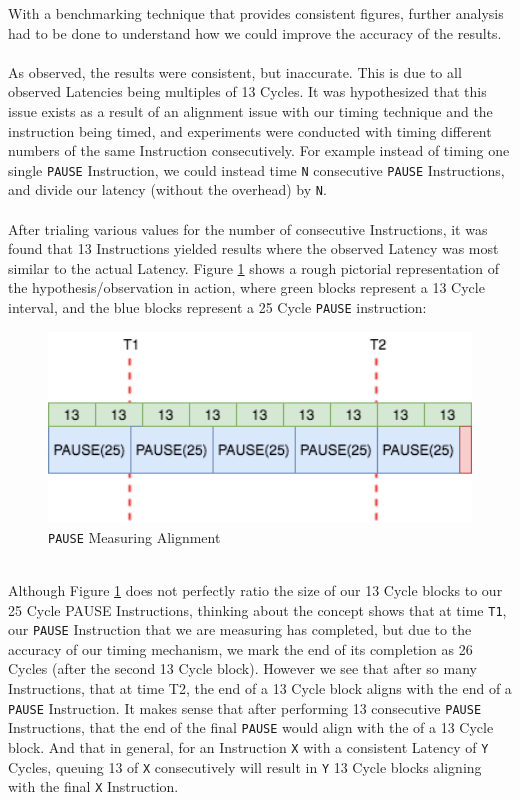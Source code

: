 \documentclass[bsc,frontabs,twoside,singlespacing,parskip,deptreport]{infthesis}     %
\begin{document}
With a benchmarking technique that provides consistent figures, further analysis had to be done to understand how we could improve the accuracy of the results. \\
\\
As observed, the results were consistent, but inaccurate. This is due to all observed Latencies being multiples of 13 Cycles. It was hypothesized that this issue exists as a result of an alignment issue with our timing technique and the instruction being timed, and experiments were conducted with timing different numbers of the same Instruction consecutively. For example instead of timing one single \texttt{PAUSE} Instruction, we could instead time \texttt{N} consecutive \texttt{PAUSE} Instructions, and divide our latency (without the overhead) by \texttt{N}. \\
\\
After trialing various values for the number of consecutive Instructions, it was found that 13 Instructions yielded results where the observed Latency was most similar to the actual Latency. Figure \ref{fig:measure-alignment} shows a rough pictorial representation of the hypothesis/observation in action, where green blocks represent a 13 Cycle interval, and the blue blocks represent a 25 Cycle \texttt{PAUSE} instruction:
\\
\begin{figure}[h]
    \includegraphics[width=12cm]{MeasureAlignment.png}
    \centering
    \caption{\texttt{PAUSE} Measuring Alignment}
    \label{fig:measure-alignment}
\end{figure}
\\
Although Figure \ref{fig:measure-alignment} does not perfectly ratio the size of our 13 Cycle blocks to our 25 Cycle PAUSE Instructions, thinking about the concept shows that at time \texttt{T1}, our \texttt{PAUSE} Instruction that we are measuring has completed, but due to the accuracy of our timing mechanism, we mark the end of its completion as 26 Cycles (after the second 13 Cycle block). However we see that after so many Instructions, that at time T2, the end of a 13 Cycle block aligns with the end of a \texttt{PAUSE} Instruction. It makes sense that after performing 13 consecutive \texttt{PAUSE} Instructions, that the end of the final \texttt{PAUSE} would align with the of a 13 Cycle block. And that in general, for an Instruction \texttt{X} with a consistent Latency of \texttt{Y} Cycles, queuing 13 of \texttt{X} consecutively will result in \texttt{Y} 13 Cycle blocks aligning with the final \texttt{X} Instruction.  \\
\end{document}
